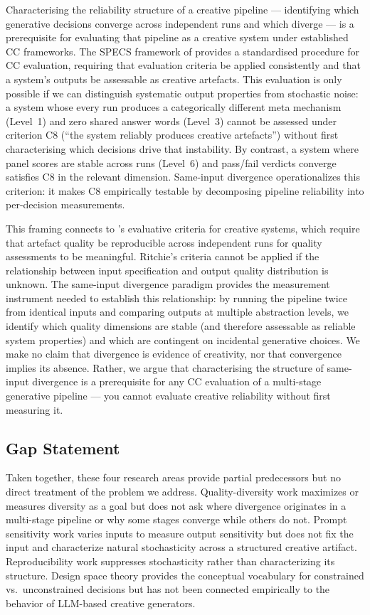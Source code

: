 Characterising the reliability structure of a creative pipeline --- identifying which generative decisions converge across independent runs and which diverge --- is a prerequisite for evaluating that pipeline as a creative system under established CC frameworks. The SPECS framework of \citet{jordanous2012standardised} provides a standardised procedure for CC evaluation, requiring that evaluation criteria be applied consistently and that a system's outputs be assessable as creative artefacts. This evaluation is only possible if we can distinguish systematic output properties from stochastic noise: a system whose every run produces a categorically different meta mechanism (Level~1) and zero shared answer words (Level~3) cannot be assessed under criterion C8 (``the system reliably produces creative artefacts'') without first characterising which decisions drive that instability. By contrast, a system where panel scores are stable across runs (Level~6) and pass/fail verdicts converge satisfies C8 in the relevant dimension. Same-input divergence operationalizes this criterion: it makes C8 empirically testable by decomposing pipeline reliability into per-decision measurements.

This framing connects to \citet{ritchie2007some}'s evaluative criteria for creative systems, which require that artefact quality be reproducible across independent runs for quality assessments to be meaningful. Ritchie's criteria cannot be applied if the relationship between input specification and output quality distribution is unknown. The same-input divergence paradigm provides the measurement instrument needed to establish this relationship: by running the pipeline twice from identical inputs and comparing outputs at multiple abstraction levels, we identify which quality dimensions are stable (and therefore assessable as reliable system properties) and which are contingent on incidental generative choices. We make no claim that divergence is evidence of creativity, nor that convergence implies its absence. Rather, we argue that characterising the structure of same-input divergence is a prerequisite for any CC evaluation of a multi-stage generative pipeline --- you cannot evaluate creative reliability without first measuring it.

\subsection*{Gap Statement}

Taken together, these four research areas provide partial predecessors but no direct treatment of the problem we address. Quality-diversity work maximizes or measures diversity as a goal but does not ask where divergence originates in a multi-stage pipeline or why some stages converge while others do not. Prompt sensitivity work varies inputs to measure output sensitivity but does not fix the input and characterize natural stochasticity across a structured creative artifact. Reproducibility work suppresses stochasticity rather than characterizing its structure. Design space theory provides the conceptual vocabulary for constrained vs.\ unconstrained decisions but has not been connected empirically to the behavior of LLM-based creative generators.


